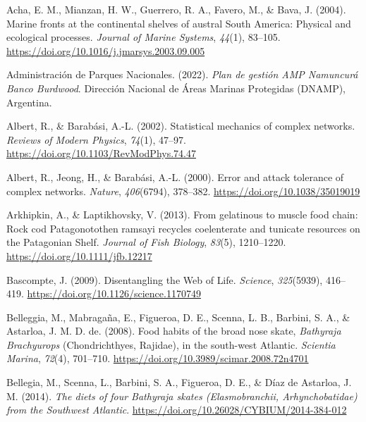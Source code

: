 \documentclass[preprint, 3p,
authoryear]{elsarticle} %
\newlength{\cslhangindent}
\newlength{\cslentryspacingunit} %
\newenvironment{CSLReferences}[2] %
 {%
  \setlength{\parindent}{0pt}
  \ifodd #1
  \let\oldpar\par
  \def\par{\hangindent=\cslhangindent\oldpar}
  \fi
  \setlength{\parskip}{#2\cslentryspacingunit}
 }%
 {}
\begin{document}
\hypertarget{refs}{}
\begin{CSLReferences}{1}{0}
\leavevmode{}%
Acha, E. M., Mianzan, H. W., Guerrero, R. A., Favero, M., \& Bava, J.
(2004). Marine fronts at the continental shelves of austral {South
America}: {Physical} and ecological processes. \emph{Journal of Marine
Systems}, \emph{44}(1), 83--105.
\url{https://doi.org/10.1016/j.jmarsys.2003.09.005}

\leavevmode{}%
Administración de Parques Nacionales. (2022). \emph{{Plan de gestión AMP
Namuncurá Banco Burdwood}}. {Dirección Nacional de Áreas Marinas
Protegidas (DNAMP), Argentina}.

\leavevmode{}%
Albert, R., \& Barabási, A.-L. (2002). Statistical mechanics of complex
networks. \emph{Reviews of Modern Physics}, \emph{74}(1), 47--97.
\url{https://doi.org/10.1103/RevModPhys.74.47}

\leavevmode{}%
Albert, R., Jeong, H., \& Barabási, A.-L. (2000). Error and attack
tolerance of complex networks. \emph{Nature}, \emph{406}(6794),
378--382. \url{https://doi.org/10.1038/35019019}

\leavevmode{}%
Arkhipkin, A., \& Laptikhovsky, V. (2013). From gelatinous to muscle
food chain: Rock cod {Patagonotothen} ramsayi recycles coelenterate and
tunicate resources on the {Patagonian Shelf}. \emph{Journal of Fish
Biology}, \emph{83}(5), 1210--1220.
\url{https://doi.org/10.1111/jfb.12217}

\leavevmode{}%
Bascompte, J. (2009). Disentangling the {Web} of {Life}. \emph{Science},
\emph{325}(5939), 416--419.
\url{https://doi.org/10.1126/science.1170749}

\leavevmode{}%
Belleggia, M., Mabragaña, E., Figueroa, D. E., Scenna, L. B., Barbini,
S. A., \& Astarloa, J. M. D. de. (2008). Food habits of the broad nose
skate, {\emph{Bathyraja}}{ \emph{Brachyurops}} ({Chondrichthyes},
{Rajidae}), in the south-west {Atlantic}. \emph{Scientia Marina},
\emph{72}(4), 701--710.
\url{https://doi.org/10.3989/scimar.2008.72n4701}

\leavevmode{}%
Bellegia, M., Scenna, L., Barbini, S. A., Figueroa, D. E., \& Díaz de
Astarloa, J. M. (2014). \emph{The diets of four {Bathyraja} skates
({Elasmobranchii}, {Arhynchobatidae}) from the {Southwest Atlantic}}.
\url{https://doi.org/10.26028/CYBIUM/2014-384-012}


\end{CSLReferences}
\end{document}
